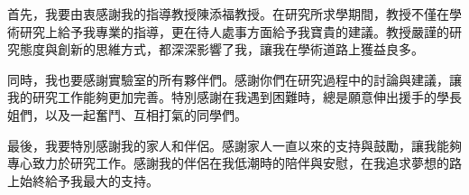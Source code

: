 \begin{acknowledgement}%

首先，我要由衷感謝我的指導教授陳添福教授。在研究所求學期間，教授不僅在學術研究上給予我專業的指導，更在待人處事方面給予我寶貴的建議。教授嚴謹的研究態度與創新的思維方式，都深深影響了我，讓我在學術道路上獲益良多。

同時，我也要感謝實驗室的所有夥伴們。感謝你們在研究過程中的討論與建議，讓我的研究工作能夠更加完善。特別感謝在我遇到困難時，總是願意伸出援手的學長姐們，以及一起奮鬥、互相打氣的同學們。

最後，我要特別感謝我的家人和伴侶。感謝家人一直以來的支持與鼓勵，讓我能夠專心致力於研究工作。感謝我的伴侶在我低潮時的陪伴與安慰，在我追求夢想的路上始終給予我最大的支持。

\thispagestyle{empty}
\end{acknowledgement}